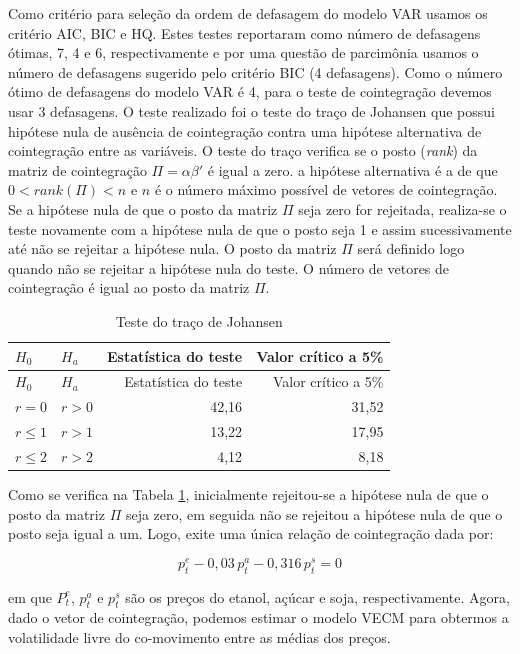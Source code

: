 Como critério para seleção da ordem de defasagem do modelo VAR usamos os
critério AIC, BIC e HQ. Estes testes reportaram como número de
defasagens ótimas, 7, 4 e 6, respectivamente e por uma questão de
parcimônia usamos o número de defasagens sugerido pelo critério BIC (4
defasagens). Como o número ótimo de defasagens do modelo VAR é 4, para o
teste de cointegração devemos usar 3 defasagens. O teste realizado foi o
teste do traço de Johansen que possui hipótese nula de ausência de
cointegração contra uma hipótese alternativa de cointegração entre as
variáveis. O teste do traço verifica se o posto (\emph{rank}) da matriz
de cointegração \(\Pi = \alpha \beta'\) é igual a zero. a hipótese
alternativa é a de que \(0<rank(\Pi)<n\) e \(n\) é o número máximo
possível de vetores de cointegração. Se a hipótese nula de que o posto
da matriz \(\Pi\) seja zero for rejeitada, realiza-se o teste novamente
com a hipótese nula de que o posto seja 1 e assim sucessivamente até não
se rejeitar a hipótese nula. O posto da matriz \(\Pi\) será definido
logo quando não se rejeitar a hipótese nula do teste. O número de
vetores de cointegração é igual ao posto da matriz \(\Pi\).

\begin{longtable}[]{@{}llrr@{}}
\caption{\label{johansen}Teste do traço de Johansen}\tabularnewline
\toprule
\(H_0\) & \(H_a\) & Estatística do teste & Valor crítico a
5\%\tabularnewline
\midrule
\endfirsthead
\toprule
\(H_0\) & \(H_a\) & Estatística do teste & Valor crítico a
5\%\tabularnewline
\midrule
\endhead
\(r=0\) & \(r>0\) & 42,16 & 31,52\tabularnewline
\(r\leq 1\) & \(r>1\) & 13,22 & 17,95\tabularnewline
\(r\leq 2\) & \(r>2\) & 4,12 & 8,18\tabularnewline
\bottomrule
\end{longtable}

Como se verifica na Tabela \ref{johansen}, inicialmente rejeitou-se a hipótese nula
de que o posto da matriz \(\Pi\) seja zero, em seguida não se rejeitou a
hipótese nula de que o posto seja igual a um. Logo, exite uma única
relação de cointegração dada por:

\begin{equation}\label{coint}
p_t^e-0,03\,p_t^a-0,316\,p_t^s=0
\end{equation}

em que \(P_t^e\), \(p_t^a\) e \(p_t^s\) são os preços do etanol, açúcar
e soja, respectivamente. Agora, dado o vetor de cointegração, podemos
estimar o modelo VECM para obtermos a volatilidade livre do co-movimento
entre as médias dos preços.

